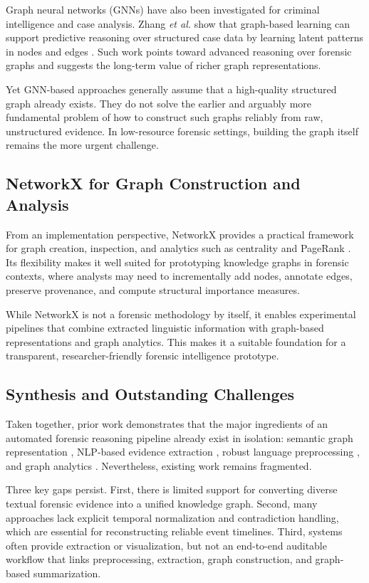 \documentclass{ieeeaccess}
\begin{document}
Graph neural networks (GNNs) have also been investigated for criminal intelligence and case analysis. Zhang \emph{et al.} show that graph-based learning can support predictive reasoning over structured case data by learning latent patterns in nodes and edges \cite{gnnforensics2021}. Such work points toward advanced reasoning over forensic graphs and suggests the long-term value of richer graph representations.

Yet GNN-based approaches generally assume that a high-quality structured graph already exists. They do not solve the earlier and arguably more fundamental problem of how to construct such graphs reliably from raw, unstructured evidence. In low-resource forensic settings, building the graph itself remains the more urgent challenge.

\subsection{NetworkX for Graph Construction and Analysis}

From an implementation perspective, NetworkX provides a practical framework for graph creation, inspection, and analytics such as centrality and PageRank \cite{networkx2008,networkxdocs}. Its flexibility makes it well suited for prototyping knowledge graphs in forensic contexts, where analysts may need to incrementally add nodes, annotate edges, preserve provenance, and compute structural importance measures.

While NetworkX is not a forensic methodology by itself, it enables experimental pipelines that combine extracted linguistic information with graph-based representations and graph analytics. This makes it a suitable foundation for a transparent, researcher-friendly forensic intelligence prototype.

\subsection{Synthesis and Outstanding Challenges}

Taken together, prior work demonstrates that the major ingredients of an automated forensic reasoning pipeline already exist in isolation: semantic graph representation \cite{xu2018dfkg}, NLP-based evidence extraction \cite{imchat2021,forensicpipeline2022}, robust language preprocessing \cite{spacy2020}, and graph analytics \cite{networkx2008}. Nevertheless, existing work remains fragmented.

Three key gaps persist. First, there is limited support for converting diverse textual forensic evidence into a unified knowledge graph. Second, many approaches lack explicit temporal normalization and contradiction handling, which are essential for reconstructing reliable event timelines. Third, systems often provide extraction or visualization, but not an end-to-end auditable workflow that links preprocessing, extraction, graph construction, and graph-based summarization.
\end{document}
